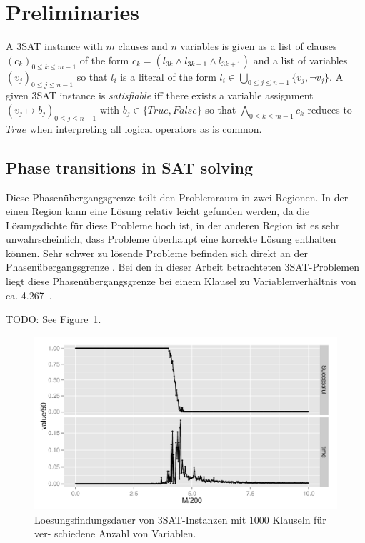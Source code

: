 \section{Preliminaries}
\label{sec:preliminaries}

A 3SAT instance with $m$ clauses and $n$ variables is given as a list of clauses $(c_k)_{0 \leq k \leq m-1}$ of the form $c_k = (l_{3k} \land l_{3k+1} \land l_{3k+1})$ and a list of variables $(v_j)_{0 \leq j \leq n-1}$ so that $l_i$ is a literal of the form $l_i \in \bigcup_{0 \leq j \leq n-1} \{v_j, \lnot v_j\}$. A given 3SAT instance is \emph{satisfiable} iff there exists a variable assignment $(v_j \mapsto b_j)_{0 \leq j \leq n-1}$ with $b_j \in \{\textit{True}, \textit{False}\}$ so that $\bigwedge_{0 \leq k \leq m-1} c_k$ reduces to $\textit{True}$ when interpreting all logical operators as is common.

\subsection{Phase transitions in SAT solving}
Diese Phasenübergangsgrenze teilt den Problemraum in zwei Regionen. In der einen Region kann eine Lösung relativ leicht gefunden werden, da die Lösungsdichte für diese Probleme hoch ist, in der anderen Region ist es sehr unwahrscheinlich, dass Probleme überhaupt eine korrekte Lösung enthalten können. Sehr schwer zu lösende Probleme befinden sich direkt an der Phasenübergangsgrenze \cite{cheeseman1991really}. Bei den in dieser Arbeit betrachteten 3SAT-Problemen liegt diese Phasenübergangsgrenze bei einem Klausel zu Variablenverhältnis von ca. 4.267~\cite{mezard2002random}.

TODO: See Figure~\ref{fig:distr}.
\begin{figure}
\centering
\includegraphics[width=.8\textwidth]{../material_2/plot_sat.pdf}
\caption{Loesungsfindungsdauer von 3SAT-Instanzen mit 1000 Klauseln für ver- schiedene Anzahl von Variablen.} \label{fig:distr}
\end{figure}

